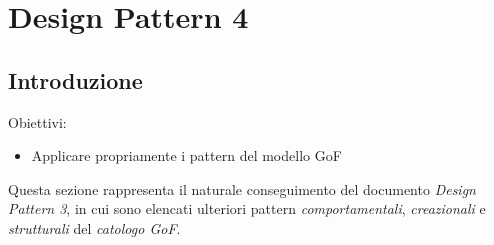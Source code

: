 \documentclass{article}
\begin{document}
\pagestyle{empty}
\section*{Design Pattern 4}
\large

\subsection*{Introduzione}
\large
Obiettivi:
\begin{itemize}
    \renewcommand{\labelitemi}{-}
    \itemsep0em
    \item Applicare propriamente i pattern del modello GoF 
\end{itemize}
Questa sezione rappresenta il naturale conseguimento del documento \textit{Design Pattern 3}, in cui sono elencati ulteriori pattern \textit{comportamentali}, \textit{creazionali} e \textit{strutturali} del \textit{catologo GoF}.
\end{document}
